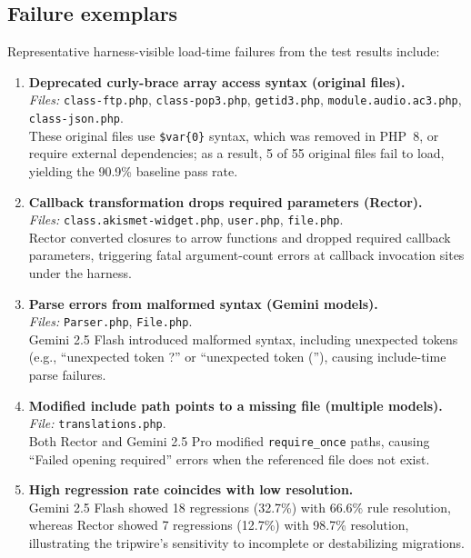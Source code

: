 \subsection{Failure exemplars}
\label{appendix:failure-exemplars}

Representative harness-visible load-time failures from the test results include:

\begin{enumerate}
  \item \textbf{Deprecated curly-brace array access syntax (original files).}\\
  \emph{Files:} \texttt{class-ftp.php}, \texttt{class-pop3.php}, \texttt{getid3.php}, \texttt{module.audio.ac3.php}, \texttt{class-json.php}.\\
  These original files use \texttt{\$var\{0\}} syntax, which was removed in PHP~8, or require external dependencies; as a result, 5 of 55 original files fail to load, yielding the 90.9\% baseline pass rate.

  \item \textbf{Callback transformation drops required parameters (Rector).}\\
  \emph{Files:} \texttt{class.akismet-widget.php}, \texttt{user.php}, \texttt{file.php}.\\
  Rector converted closures to arrow functions and dropped required callback parameters, triggering fatal argument-count errors at callback invocation sites under the harness.

  \item \textbf{Parse errors from malformed syntax (Gemini models).}\\
  \emph{Files:} \texttt{Parser.php}, \texttt{File.php}.\\
  Gemini 2.5 Flash introduced malformed syntax, including unexpected tokens (e.g., ``unexpected token ?'' or ``unexpected token (''), causing include-time parse failures.

  \item \textbf{Modified include path points to a missing file (multiple models).}\\
  \emph{File:} \texttt{translations.php}.\\
  Both Rector and Gemini 2.5 Pro modified \texttt{require\_once} paths, causing ``Failed opening required'' errors when the referenced file does not exist.

  \item \textbf{High regression rate coincides with low resolution.}\\
  Gemini 2.5 Flash showed 18 regressions (32.7\%) with 66.6\% rule resolution, whereas Rector showed 7 regressions (12.7\%) with 98.7\% resolution, illustrating the tripwire's sensitivity to incomplete or destabilizing migrations.
\end{enumerate}

